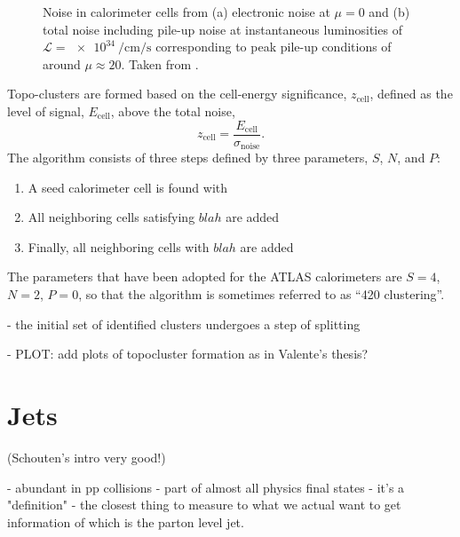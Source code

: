 \begin{figure}
        
\caption{Noise in calorimeter cells from (a) electronic noise at $\mu=0$ and (b) total noise including pile-up noise at instantaneous luminosities of $\mathcal{L} = \SI{e34}{\per\cm\per\s}$ corresponding to peak pile-up conditions of around $\mu\approx20$. Taken from .}
\end{figure}


Topo-clusters are formed based on the cell-energy significance, $z_{\text{cell}}$, defined as the level of signal, $E_{\text{cell}}$, above the total noise, 
\begin{equation}
    z_{\text{cell}} = \frac{E_{\text{cell}}}{\sigma_{\text{noise}}}. 
\end{equation}
The algorithm consists of three steps defined by three parameters, $S$, $N$, and $P$:

\begin{enumerate}
    \item A seed calorimeter cell is found with 
    \item All neighboring cells satisfying $blah$ are added
    \item Finally, all neighboring cells with $blah$ are added
\end{enumerate}

The parameters that have been adopted for the ATLAS calorimeters are $S = 4$, $N = 2$, $P = 0$, so that the algorithm is sometimes referred to as ``420 clustering''. 

- the initial set of identified clusters undergoes a step of splitting

- PLOT: add plots of topocluster formation as in Valente's thesis?




\section{Jets}
(Schouten's intro very good!)

- abundant in pp collisions
- part of almost all physics final states
- it's a "definition"
- the closest thing to measure to what we actual want to get information of which is the parton level jet.

